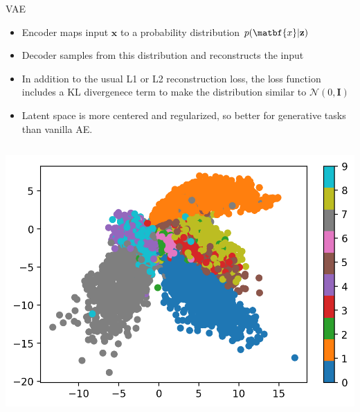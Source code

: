 \documentclass[./main.tex]{subfiles}
\begin{document}
\begin{frame}[label={sec:orgf6035ca}]{VAE}
\begin{itemize}
\item Encoder maps input \(\mathbf{x}\) to a probability distribution \(p(\matbf{x}|\mathbf{z})\)
\item Decoder samples from this distribution and reconstructs the input
\item In addition to the usual L1 or L2 reconstruction loss, the loss function includes a KL divergenece term to make the distribution similar to \(\mathcal{N}(0, \mathbf{I})\)
\item Latent space is more centered and regularized, so better for generative tasks than vanilla AE.
\end{itemize}
\begin{columns}
\begin{column}{0.5\columnwidth}
\begin{adjustbox}{width=\textwidth,totalheight=0.6\paperheight,keepaspectratio,center}
\includegraphics[width=\textwidth]{./figs/AE_Latent_Space.png}
\end{adjustbox}
\end{column}


\end{columns}
\end{frame}
\end{document}
